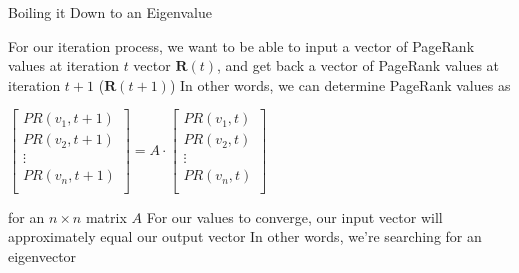 \documentclass{beamer}
\begin{document}
\begin{frame}[t]{Boiling it Down to an Eigenvalue}
\begin{outline}
    \1 For our iteration process, we want to be able to input a vector of PageRank values at iteration $t$ vector $\mathbf{R}(t)$, and get back a vector of PageRank values at iteration $t+1$ ($\mathbf{R}(t+1)$)
    \1 In other words, we can determine PageRank values as 
    \begin{center}
        \begin{math}
            \begin{bmatrix}
                PR(v_1, t+1)\\
                PR(v_2, t+1)\\
                \vdots\\
                PR(v_n, t+1)\\
            \end{bmatrix} = A\cdot \begin{bmatrix}
                PR(v_1, t)\\
                PR(v_2, t)\\
                \vdots\\
                PR(v_n, t)\\
            \end{bmatrix}
        \end{math}
    \end{center}
    for an $n\times n$ matrix $A$ 
    \1 For our values to converge, our input vector will approximately equal our output vector 
    \1 In other words, we're searching for an eigenvector
\end{outline}
\end{frame}
\end{document}
